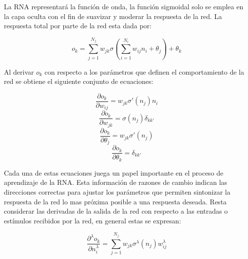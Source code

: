 La RNA representar\'a la funci\'on de onda, la funci\'on sigmoidal
solo se emplea en la capa oculta con el fin de suavizar
y moderar la respuesta de la red. La respuesta total por parte
de la red esta dada por:

\begin{equation}
	o_k=\sum^{N_j}_{j=1}w_{jk}\sigma(\sum^{N_i}_{i=1}w_{ij}n_i+\theta_j)+\theta_k
\end{equation}

Al derivar $o_k$ con respecto a los par\'ametros que definen
el comportamiento de la red se obtiene el siguiente conjunto
de ecuaciones:

\begin{equation}
	\frac{\partial o_k}{\partial w_{ij}}=w_{jk}\sigma' (n_j)n_i
\end{equation}
\begin{equation}
	\frac{\partial o_k}{\partial w_{jk}}=\sigma (n_j)\delta_{kk'}
\end{equation}
\begin{equation}
	\frac{\partial o_k}{\partial \theta_j}=w_{jk}\sigma' (n_j)
\end{equation}
\begin{equation}
	\frac{\partial o_k}{\partial \theta_k}=\delta_{kk'}
\end{equation}


Cada una de estas ecuaciones juega un papel importante
en el proceso de aprendizaje de la RNA. Esta informaci\'on
de razones de cambio indican las direcciones correctas para
ajustar los par\'ametros que permiten sintonizar la respuesta de
la red lo mas pr\'oxima posible a una respuesta deseada. Resta
considerar las derivadas de la salida de la red con respecto a
las entradas o est\'imulos recibidos por la red, en general estas
se expresan:

\begin{equation}
	\frac{\partial^\lambda o_k}{\partial n_i^\lambda}=\sum^{N_j}_{j=1}w_{jk}\sigma^\lambda(n_j)w_{ij}^\lambda
	\label{lamda}
\end{equation}
